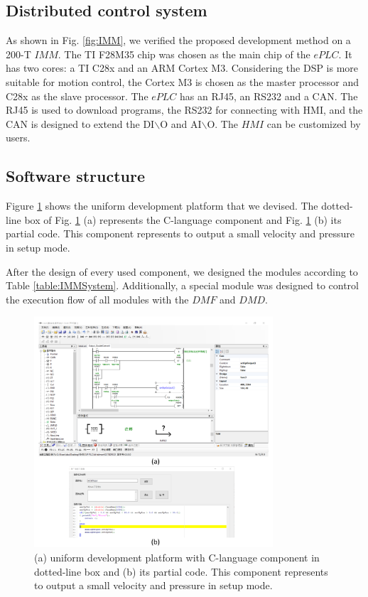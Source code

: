 \documentclass[journal,UTF8]{IEEEtran}
\begin{document}
\subsection{Distributed control system}
As shown in Fig. \ref{fig:IMM}, we verified the proposed development method on a 200-T $IMM$. The TI F28M35 chip was chosen as the main chip of the $ePLC$. It has two cores: a TI C28x and an ARM Cortex M3. Considering the DSP is more suitable for motion control, the Cortex M3 is chosen as the master processor and C28x as the slave processor. The $ePLC$ has an RJ45, an RS232 and a CAN. The RJ45 is used to download programs, the RS232 for connecting with HMI, and the CAN is designed to extend the DI$\backslash$O and AI$\backslash$O. The $HMI$ can be customized by users.

\subsection{Software structure}
Figure \ref{fig:ld} shows the uniform development platform that we devised. The dotted-line box of Fig. \ref{fig:ld} (a) represents the C-language component and Fig. \ref{fig:ld} (b) its partial code. This component represents to output a small velocity and pressure in setup mode.

After the design of every used component, we designed the modules according to Table \ref{table:IMMSystem}. Additionally, a special module was designed to control the execution flow of all modules with the $DMF$ and $DMD$.

\begin{figure}
	\centering
	\includegraphics[width=3.5in]{fig/ld.pdf}
	\caption{(a) uniform development platform with C-language component in dotted-line box and (b) its partial code. This component represents to output a small velocity and pressure in setup mode.}
	\label{fig:ld}
\end{figure}
\end{document}
